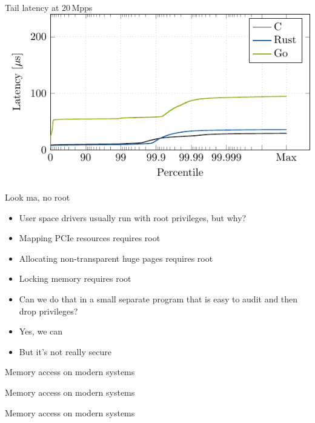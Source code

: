 \documentclass[NET,english,aspectratio=43,notitleframe]{tumbeamer}
\begin{document}
\begin{frame}{Tail latency at 20\,Mpps}
\centering\includegraphics[scale=1.1]{figures/latency-20/latency-ccdf.pdf}
\end{frame}

\begin{frame}{Look ma, no root}
\begin{itemize}
\item User space drivers usually run with root privileges, but why?
\pause
\vspace{1em}
\item Mapping PCIe resources requires root
\item Allocating non-transparent huge pages requires root
\item Locking memory requires root
\vspace{1em}
\item Can we do that in a small separate program that is easy to audit and then drop privileges?
\pause
\item Yes, we can
\item But it's not really secure
\end{itemize}
\end{frame}

\begin{frame}{Memory access on modern systems}
\centering
\end{frame}

\begin{frame}{Memory access on modern systems}
\centering
\end{frame}

\begin{frame}{Memory access on modern systems}
\centering
\end{frame}
\end{document}
